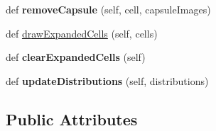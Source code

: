\begin{DoxyCompactItemize}
def {\bfseries remove\+Capsule} (self, cell, capsule\+Images)
\item 
def \hyperlink{classgraphics_display_1_1_pacman_graphics_a9097dacf55460e7a0c6a1b2c8f1a7346}{draw\+Expanded\+Cells} (self, cells)
\item 
\mbox{\label{classgraphics_display_1_1_pacman_graphics_ae4f415c33b65793e33d2ca369e8556b4}} 
def {\bfseries clear\+Expanded\+Cells} (self)
\item 
\mbox{\label{classgraphics_display_1_1_pacman_graphics_ae26e9ef2dea7f3cc59de2b0061dc33d3}} 
def {\bfseries update\+Distributions} (self, distributions)
\end{DoxyCompactItemize}
\subsection*{Public Attributes}
